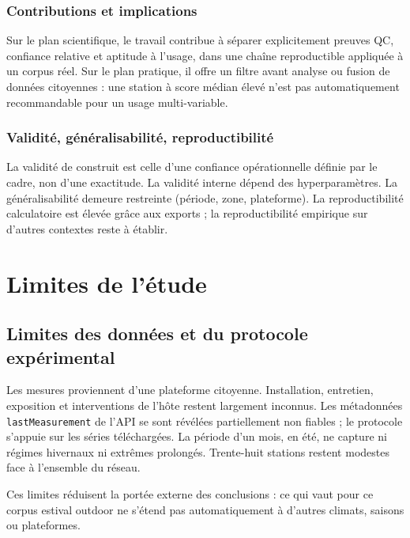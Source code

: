 \subsubsection{Contributions et implications}

Sur le plan scientifique, le travail contribue à séparer explicitement preuves
QC, confiance relative et aptitude à l'usage, dans une chaîne reproductible
appliquée à un corpus réel. Sur le plan pratique, il offre un filtre avant
analyse ou fusion de données citoyennes : une station à score médian élevé
n'est pas automatiquement recommandable pour un usage multi-variable.

\subsubsection{Validité, généralisabilité, reproductibilité}

La validité de construit est celle d'une confiance opérationnelle définie par
le cadre, non d'une exactitude. La validité interne dépend des hyperparamètres.
La généralisabilité demeure restreinte (période, zone, plateforme). La
reproductibilité calculatoire est élevée grâce aux exports ; la reproductibilité
empirique sur d'autres contextes reste à établir.

\section{Limites de l'étude}
\label{sec:limites}

\subsection{Limites des données et du protocole expérimental}

Les mesures proviennent d'une plateforme citoyenne. Installation, entretien,
exposition et interventions de l'hôte restent largement inconnus. Les
métadonnées \texttt{lastMeasurement} de l'API se sont révélées partiellement
non fiables ; le protocole s'appuie sur les séries téléchargées. La période d'un
mois, en été, ne capture ni régimes hivernaux ni extrêmes prolongés.
Trente-huit stations restent modestes face à l'ensemble du réseau.

Ces limites réduisent la portée externe des conclusions : ce qui vaut pour ce
corpus estival outdoor ne s'étend pas automatiquement à d'autres climats,
saisons ou plateformes.

